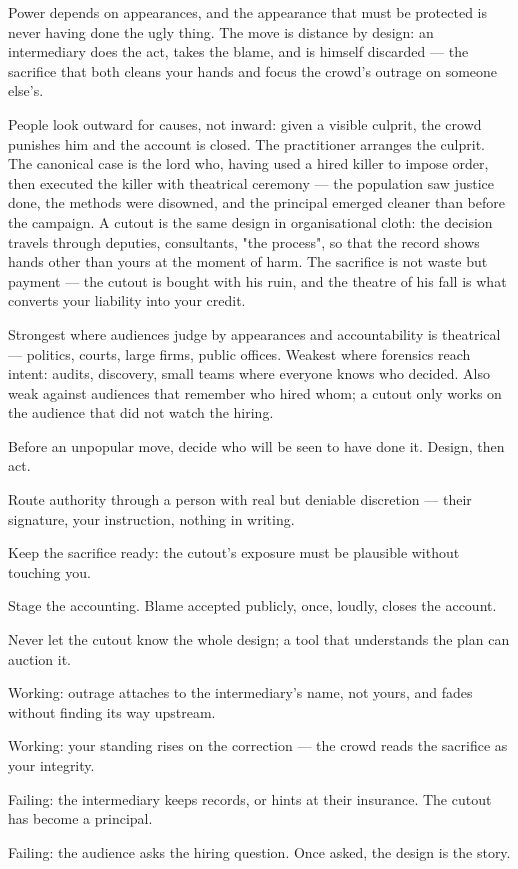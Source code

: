 \begin{core}
Power depends on appearances, and the appearance that must be protected is never having done the ugly thing. The move is distance by design: an intermediary does the act, takes the blame, and is himself discarded --- the sacrifice that both cleans your hands and focus the crowd's outrage on someone else's.
\end{core}
\begin{mechanism}
People look outward for causes, not inward: given a visible culprit, the crowd punishes him and the account is closed. The practitioner arranges the culprit. The canonical case is the lord who, having used a hired killer to impose order, then executed the killer with theatrical ceremony --- the population saw justice done, the methods were disowned, and the principal emerged cleaner than before the campaign. A cutout is the same design in organisational cloth: the decision travels through deputies, consultants, "the process", so that the record shows hands other than yours at the moment of harm. The sacrifice is not waste but payment --- the cutout is bought with his ruin, and the theatre of his fall is what converts your liability into your credit.
\end{mechanism}
\begin{conditions}
Strongest where audiences judge by appearances and accountability is theatrical --- politics, courts, large firms, public offices. Weakest where forensics reach intent: audits, discovery, small teams where everyone knows who decided. Also weak against audiences that remember who hired whom; a cutout only works on the audience that did not watch the hiring.
\end{conditions}
\begin{application}
  \item Before an unpopular move, decide who will be seen to have done it. Design, then act.
  \item Route authority through a person with real but deniable discretion --- their signature, your instruction, nothing in writing.
  \item Keep the sacrifice ready: the cutout's exposure must be plausible without touching you.
  \item Stage the accounting. Blame accepted publicly, once, loudly, closes the account.
  \item Never let the cutout know the whole design; a tool that understands the plan can auction it.
\end{application}
\begin{feedback}
  \item Working: outrage attaches to the intermediary's name, not yours, and fades without finding its way upstream.
  \item Working: your standing rises on the correction --- the crowd reads the sacrifice as your integrity.
  \item Failing: the intermediary keeps records, or hints at their insurance. The cutout has become a principal.
  \item Failing: the audience asks the hiring question. Once asked, the design is the story.
\end{feedback}
